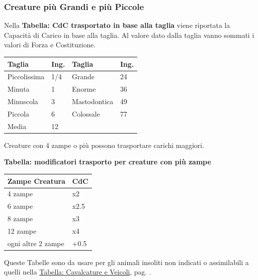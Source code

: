 \begin{multicols}{2}
\subsubsection{Creature più Grandi e più Piccole}\label{tagliaeportata}

Nella \textbf{Tabella: CdC trasportato in base alla taglia} viene riportata la Capacità di Carico in base alla taglia. Al valore dato dalla taglia vanno sommati i valori di Forza e Costituzione.

\medskip

\noindent\begin{tabularx}{0.45\textwidth}{ll|ll}
	\toprule
\textbf{Taglia}& \textbf{Ing.}&\textbf{Taglia} & \textbf{Ing.}\\
\toprule
Piccolissima &1/4& Grande & 24\\
Minuta & 1 & Enorme& 36\\
Minuscola & 3& Mastodontica&49\\
Piccola & 6 & Colossale&77\\
Media & 12&&
\end{tabularx}

\medskip

Creature con 4 zampe o più possono trasportare carichi maggiori.


\textbf{Tabella: modificatori trasporto per creature con più zampe}

\medskip

\noindent\begin{tabularx}{0.45\textwidth}{ll}
	\toprule
\textbf{Zampe Creatura}&\textbf{CdC}\\
\toprule
4 zampe & x2\\
6 zampe & x2.5\\
8 zampe & x3\\
12 zampe & x4\\
ogni altre 2 zampe & +0.5
\end{tabularx}

\medskip

Queste Tabelle sono da usare per gli animali insoliti non indicati o assimilabili a quelli nella \hyperlink{TabellaCavalcatureeVeicoli}{Tabella: Cavalcature e Veicoli}, pag. \pageref{TabellaCavalcatureeVeicoli}.


\end{multicols}

